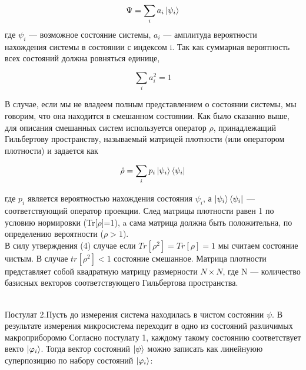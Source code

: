 \documentclass[a4paper, 10pt]{article}
\begin{document}
        \begin{equation}\label{link name}
            \Psi = \sum_i a_i \ket{\psi_i}
        \end{equation}
        где $\psi_i$ --- возможное состояние системы, $a_i$ --- амплитуда вероятности нахождения системы в состоянии с индексом i. Так как суммарная 
        вероятность всех состояний должна ровняться единице,
        
        \begin{equation}\label{link name}
            \sum_{i} a_i^2 = 1
        \end{equation}

        В случае, если мы не владеем полным представлением о состоянии системы, мы говорим, что она находится в смешанном состоянии. Как было сказанно выше,
        для описания смешанных систем используется оператор $\rho$, принадлежащий Гильбертову пространству, называемый матрицей плотности (или оператором 
        плотности) и задается как

        \begin{equation}\label{link name}
            \hat{\rho} = \sum_i p_i \ket{\psi_i} \bra{\psi_i}
        \end{equation}

        где $p_i$ является вероятностью нахождения состояния $\psi_i$, а $\ket{\psi_i}\bra{\psi_i}$ --- соответствующий оператор проекции.
        След матрицы плотности равен 1 по условию нормировки (Tr[$\rho$]=1), a сама матрица должна быть положительна, 
        по определению вероятности ($\rho > 1$). \\
        В силу утверждения (4) случае если $Tr[\rho^2] = Tr[\rho] = 1$ мы считаем состояние чистым. В случае $tr[\rho^2] < 1$ состояние смешанное.
        Матрица плотности представляет собой квадратную матрицу размерности $N \times N$, где N --- количество базисных векторов соответствующего 
        Гильбертова пространства.
        \\ \\
        \begin{itshape}
            Постулат 2.Пусть до измерения система находилась в чистом состоянии $\psi$. В результате измерения микросистема 
            переходит в одно из состояний различимых макроприборомю Согласно постулату 1, каждому такому состоянию соответствует векто $\ket{\varphi_i}$. 
            Тогда вектор состояний $\ket{\psi}$ можно записать как линейнуюю суперпозицию по набору состояний $\ket{\varphi_i}$:
        \end{itshape}
        \\
\end{document}
